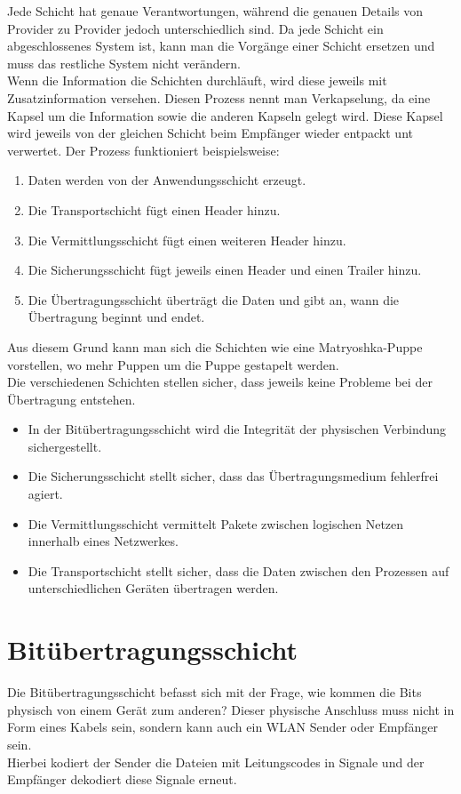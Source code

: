 \documentclass{article}
\begin{document}
	 Jede Schicht hat genaue Verantwortungen, während die genauen Details von Provider zu Provider jedoch unterschiedlich sind. Da jede Schicht ein abgeschlossenes System ist, kann man die Vorgänge einer Schicht ersetzen und muss das restliche System nicht verändern. \\
	 Wenn die Information die Schichten durchläuft, wird diese jeweils mit Zusatzinformation versehen. Diesen Prozess nennt man Verkapselung, da eine Kapsel um die Information sowie die anderen Kapseln gelegt wird. Diese Kapsel wird jeweils von der gleichen Schicht beim Empfänger wieder entpackt unt verwertet. Der Prozess funktioniert beispielsweise:
	 \begin{enumerate}
	 	\item{Daten werden von der Anwendungsschicht erzeugt.}
	 	\item{Die Transportschicht fügt einen Header hinzu.}
	 	\item{Die Vermittlungsschicht fügt einen weiteren Header hinzu.}
	 	\item{Die Sicherungsschicht fügt jeweils einen Header und einen Trailer hinzu.}
	 	\item{Die Übertragungsschicht überträgt die Daten und gibt an, wann die Übertragung beginnt und endet.}
	 \end{enumerate}
	 Aus diesem Grund kann man sich die Schichten wie eine Matryoshka-Puppe vorstellen, wo mehr Puppen um die Puppe gestapelt werden. \\
	 Die verschiedenen Schichten stellen sicher, dass jeweils keine Probleme bei der Übertragung entstehen.
	 \begin{itemize}
	 	\item{In der Bitübertragungsschicht wird die Integrität der physischen Verbindung sichergestellt.}
	 	\item{Die Sicherungsschicht stellt sicher, dass das Übertragungsmedium fehlerfrei agiert.}
	 	\item{Die Vermittlungsschicht vermittelt Pakete zwischen logischen Netzen innerhalb eines Netzwerkes.}
	 	\item{Die Transportschicht stellt sicher, dass die Daten zwischen den Prozessen auf unterschiedlichen Geräten übertragen werden.}
	 \end{itemize}
	 \section{Bitübertragungsschicht}
	 Die Bitübertragungsschicht befasst sich mit der Frage, wie kommen die Bits physisch von einem Gerät zum anderen? Dieser physische Anschluss muss nicht in Form eines Kabels sein, sondern kann auch ein WLAN Sender oder Empfänger sein. \\
	 Hierbei kodiert der Sender die Dateien mit Leitungscodes in Signale und der Empfänger dekodiert diese Signale erneut.
\end{document}
